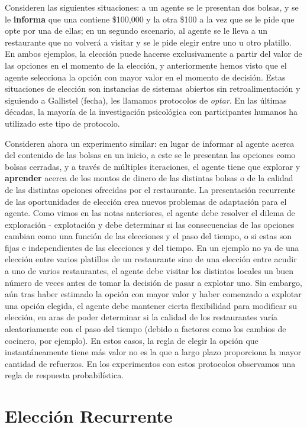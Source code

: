 \documentclass[
  letterpaper,
]{book}
\begin{document}
Consideren las siguientes situaciones: a un agente se le presentan dos
bolsas, y se le \textbf{informa} que una contiene \$100,000 y la otra
\$100 a la vez que se le pide que opte por una de ellas; en un segundo
escenario, al agente se le lleva a un restaurante que no volverá a
visitar y se le pide elegir entre uno u otro platillo. En ambos
ejemplos, la elección puede hacerse exclusivamente a partir del valor de
las opciones en el momento de la elección, y anteriormente hemos visto
que el agente selecciona la opción con mayor valor en el momento de
decisión. Estas situaciones de elección son instancias de sistemas
abiertos sin retroalimentación y siguiendo a Gallistel (fecha), les
llamamos protocolos de \emph{optar}. En las últimas décadas, la mayoría
de la investigación psicológica con participantes humanos ha utilizado
este tipo de protocolo.

Consideren ahora un experimento similar: en lugar de informar al agente
acerca del contenido de las bolsas en un inicio, a este se le presentan
las opciones como bolsas cerradas, y a través de múltiples iteraciones,
el agente tiene que explorar y \textbf{aprender} acerca de los montos de
dinero de las distintas bolsas o de la calidad de las distintas opciones
ofrecidas por el restaurante. La presentación recurrente de las
oportunidades de elección crea nuevos problemas de adaptación para el
agente. Como vimos en las notas anteriores, el agente debe resolver el
dilema de exploración - explotación y debe determinar si las
consecuencias de las opciones cambian como una función de las elecciones
y el paso del tiempo, o si estas son fijas e independientes de las
elecciones y del tiempo. En un ejemplo no ya de una elección entre
varios platillos de un restaurante sino de una elección entre acudir a
uno de varios restaurantes, el agente debe visitar los distintos locales
un buen número de veces antes de tomar la decisión de pasar a explotar
uno. Sin embargo, aún tras haber estimado la opción con mayor valor y
haber comenzado a explotar una opción elegida, el agente debe mantener
cierta flexibilidad para modificar su elección, en aras de poder
determinar si la calidad de los restaurantes varía aleatoriamente con el
paso del tiempo (debido a factores como los cambios de cocinero, por
ejemplo). En estos casos, la regla de elegir la opción que
instantáneamente tiene más valor no es la que a largo plazo proporciona
la mayor cantidad de refuerzos. En los experimentos con estos protocolos
observamos una regla de respuesta probabilística.

\section{Elección Recurrente}\label{elecciuxf3n-recurrente}
\end{document}
